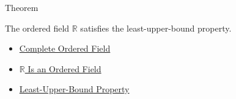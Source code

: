 \begin{theorembox}{Theorem}
\begin{theorem}
\label{thm:r-is-complete-ordered-field}
The ordered field $\mathbb{R}$ satisfies the least-upper-bound property.
\end{theorem}
\end{theorembox}

\begin{dependencies}
\begin{itemize}
  \item \hyperref[def:real-ordered-field]{Complete Ordered Field}
  \item \hyperref[thm:r-is-an-ordered-field]{$\mathbb{R}$ Is an Ordered Field}
  \item \hyperref[thm:lub-property-r]{Least-Upper-Bound Property}
\end{itemize}
\end{dependencies}
